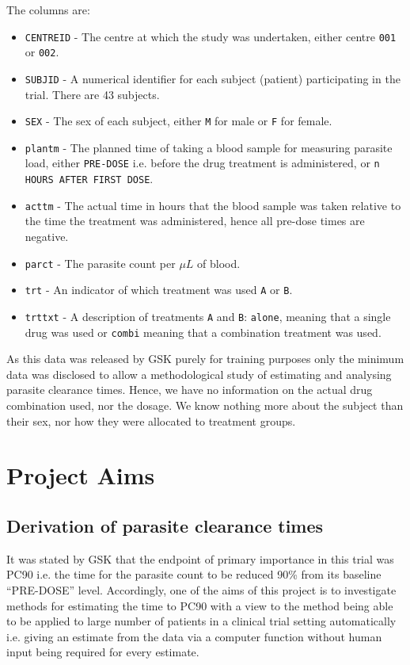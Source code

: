 The columns are:
\begin{itemize}
\item\texttt{CENTREID} - The centre at which the study was undertaken, either centre \texttt{001} or \texttt{002}.
\item\texttt{SUBJID} - A numerical identifier for each subject (patient) participating in the trial. There are 43 subjects.
\item\texttt{SEX} - The sex of each subject, either \texttt{M} for male or \texttt{F} for female.
\item\texttt{plantm} - The planned time of taking a blood sample for measuring parasite load, either \texttt{PRE-DOSE} i.e. before the drug treatment is administered, or \texttt{n HOURS AFTER FIRST DOSE}.
\item\texttt{acttm} - The actual time in hours that the blood sample was taken relative to the time the treatment was administered, hence all pre-dose times are negative.
\item\texttt{parct} - The parasite count per $\mu L$ of blood.
\item\texttt{trt} - An indicator of which treatment was used \texttt{A} or \texttt{B}.
\item\texttt{trttxt} - A description of treatments \texttt{A} and \texttt{B}: \texttt{alone}, meaning that a single drug was used or \texttt{combi} meaning that a combination treatment was used.
\end{itemize}

As this data was released by GSK purely for training purposes only the minimum data was disclosed to allow a methodological study of estimating and analysing parasite clearance times. Hence, we have no information on the actual drug combination used, nor the dosage. We know nothing more about the subject than their sex, nor how they were allocated to treatment groups.

\section{Project Aims}
\subsection{Derivation of parasite clearance times}
It was stated by GSK that the endpoint of primary importance in this trial was PC90 i.e. the time for the parasite count to be reduced 90\% from its baseline ``PRE-DOSE'' level. Accordingly, one of the aims of this project is to investigate methods for estimating the time to PC90 with a view to the method being able to be applied to large number of patients in a clinical trial setting automatically i.e. giving an estimate from the data via a computer function without human input being required for every estimate.

